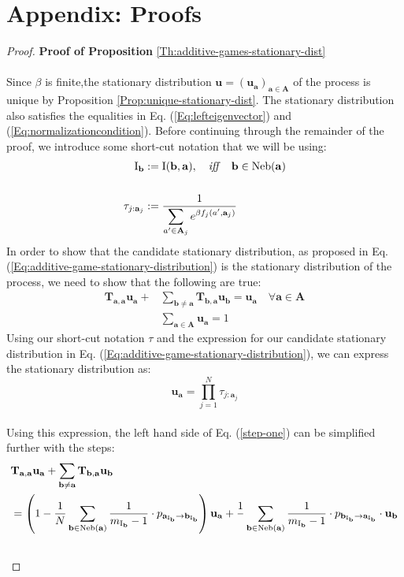 \documentclass[11pt]{article}
\theoremstyle{plainCl1}
\theoremstyle{plainCl2}
\newcommand{\A}{\mathbf{A}}
\newcommand{\abf}{\mathbf{a}}
\newcommand{\bbf}{\mathbf{b}}
\newcommand{\T}{\mathbf{T}}
\newcommand{\ubf}{\mathbf{u}}
\begin{document}
\section*{Appendix: Proofs}
\label{Section:Appendix}
\begin{proof}
\textbf{Proof of Proposition} \ref{Th:additive-games-stationary-dist} \\ \\ 
Since $\beta$ is finite,the stationary distribution $\ubf = (\ubf_\abf)_{\abf \in \A}$ of the process is unique by Proposition \ref{Prop:unique-stationary-dist}. The stationary distribution also satisfies the equalities in Eq. (\ref{Eq:lefteigenvector}) and (\ref{Eq:normalizationcondition}). Before continuing through the remainder of the proof, we introduce some short-cut notation that we will be using:\\
\begin{align}
\mathrm{I}_{\bbf} &:= \mathrm{I}(\bbf,\abf), \quad \mathit{iff} \quad \bbf \in \mathrm{Neb}(\abf) \\ \notag \\ 
\label{Eq:shortcut-tau}
\tau_{j:\abf_j} &:= \frac{1}{\displaystyle \sum_{a' \in \A_j} e^{\beta f_j(a',  \abf_j)}} 
\end{align}
\noindent In order to show that the candidate stationary distribution, as proposed in Eq. (\ref{Eq:additive-game-stationary-distribution}) is the stationary distribution of the process, we need to show that the following are true:
\begin{align}
\label{step-one}
\T_{\abf,\abf} \ubf_\abf  + &\sum_{\bbf \neq \abf} \T_{\bbf, \abf} \ubf_{\bbf} = \ubf_\abf \quad \forall \abf \in \A \\[10pt]
\label{step-two}
&\sum_{\abf \in \A} \ubf_\abf  = 1
\end{align} 
Using our short-cut notation $\tau$ and the expression for our candidate stationary distribution in Eq. (\ref{Eq:additive-game-stationary-distribution}), we can express the stationary distribution as: 
\begin{equation}
\ubf_\abf = \prod_{j=1}^N \tau_{j:\abf_j}
\label{Eq:additive-stat-shortcut}
\end{equation} \\ 
Using this expression, the left hand side of Eq. (\ref{step-one}) can be simplified further with the steps: 
\begin{align}
&\T_{\abf,\abf} \ubf_\abf  + \sum_{\bbf \neq \abf} \T_{\bbf, \abf} \ubf_{\bbf}\\
&= \left( 1 - \frac{1}{N} \sum_{\bbf \in \mathrm{Neb}(\abf)} \frac{1}{m_{\mathrm{I}_\bbf}-1} \cdot p_{\abf_{\mathrm{I}_\bbf} \to \bbf_{\mathrm{I}_\bbf}} \right) \ubf_{\abf}+ \frac{1}{}\sum_{\bbf \in \mathrm{Neb}(\abf)}  \frac{1}{m_{\mathrm{I}_\bbf}-1} \cdot p_{\bbf_{\mathrm{I}_\bbf} \to \abf_{\mathrm{I}_\bbf}} \cdot \ubf_{\bbf}\\ \notag \\

\end{align}
\end{proof}
\end{document}
